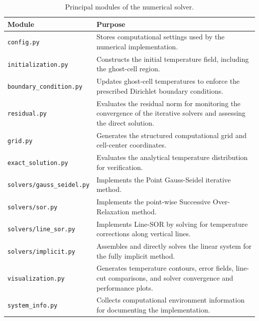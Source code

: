 \begin{table}[H]
\centering
\small
\caption{Principal modules of the numerical solver.}
\label{tab:solver_modules}
\begin{tabularx}{\textwidth}{l X}
\toprule
\textbf{Module} & \textbf{Purpose} \\
\midrule

\texttt{config.py}
& Stores computational settings used by the numerical implementation. \\

\texttt{initialization.py}
& Constructs the initial temperature field, including the ghost-cell region. \\

\texttt{boundary\_condition.py}
& Updates ghost-cell temperatures to enforce the prescribed Dirichlet boundary conditions. \\

\texttt{residual.py}
& Evaluates the residual norm for monitoring the convergence of the iterative solvers and assessing the direct solution. \\

\texttt{grid.py}
& Generates the structured computational grid and cell-center coordinates. \\

\texttt{exact\_solution.py}
& Evaluates the analytical temperature distribution for verification. \\

\texttt{solvers/gauss\_seidel.py}
& Implements the Point Gauss-Seidel iterative method. \\

\texttt{solvers/sor.py}
& Implements the point-wise Successive Over-Relaxation method. \\

\texttt{solvers/line\_sor.py}
& Implements Line-SOR by solving for temperature corrections along vertical lines. \\

\texttt{solvers/implicit.py}
& Assembles and directly solves the linear system for the fully implicit method. \\

\texttt{visualization.py}
& Generates temperature contours, error fields, line-cut comparisons, and solver convergence and performance plots. \\

\texttt{system\_info.py}
& Collects computational environment information for documenting the implementation. \\

\bottomrule
\end{tabularx}
\end{table}

